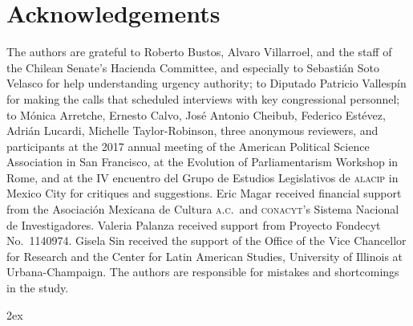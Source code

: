 \documentclass[letter,12pt]{article}
\newcommand{\listofendnotes}{
   \begingroup
   \parindent 0pt
   \parskip 2ex
   \def\enotesize{\normalsize}
   \theendnotes
   \endgroup
}
\begin{document}
\section*{Acknowledgements}
The authors are grateful to Roberto Bustos, Alvaro Villarroel, and the staff of the Chilean Senate's Hacienda Committee, and especially to Sebasti\'an Soto Velasco for help understanding urgency authority; to Diputado Patricio Vallesp\'in for making the calls that scheduled interviews with key congressional personnel; to M\'onica Arretche, Ernesto Calvo, Jos\'e Antonio Cheibub, Federico Est\'evez, Adri\'an Lucardi, Michelle Taylor-Robinson, three anonymous reviewers, and participants at the 2017 annual meeting of the American Political Science Association in San Francisco, at the Evolution of Parliamentarism Workshop in Rome, and at the IV encuentro del Grupo de Estudios Legislativos de \textsc{alacip} in Mexico City for critiques and suggestions. Eric Magar received financial support from the Asociaci\'on Mexicana de Cultura \textsc{a.c.}\ and \textsc{conacyt}'s Sistema Nacional de Investigadores. Valeria Palanza received support from Proyecto Fondecyt No.\ 1140974. Gisela Sin received the support of the Office of the Vice Chancellor for Research and the Center for Latin American Studies, University of Illinois at Urbana-Champaign. The authors are responsible for mistakes and shortcomings in the study.

\listofendnotes



%
\end{document}
